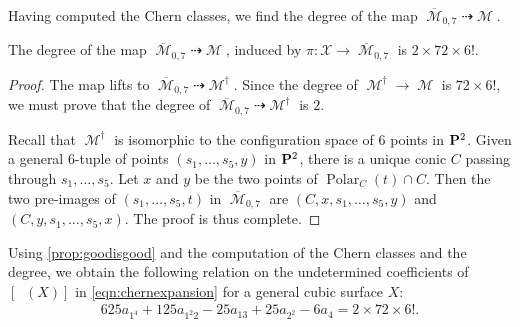 \documentclass[reqno]{amsart}
\DeclareMathOperator{\Orb}{\overline{Orb}}
\DeclareMathOperator{\Polar}{Polar}
\DeclareMathOperator{\M}{\mathcal{M}}
\renewcommand{\to}{{\longrightarrow}}
\renewcommand {\P}{{\bf P}}
\numberwithin{equation}{section}
\begin{document}
Having computed the Chern classes, we find the degree of the map $\overline{\M}_{0,7} \dashrightarrow \M$.
\begin{proposition}\label{prop:deg2}
  The degree of the map $\overline{\M}_{0,7} \dashrightarrow \M$, induced by $\pi \colon \mathcal{X} \to \overline{\M}_{0,7}$ is $2 \times 72 \times 6!$.
\end{proposition}
\begin{proof}
  The map lifts to $\overline{\M}_{0,7} \dashrightarrow \M^{\dagger}$.
  Since the degree of $\M^{\dagger} \to \M$ is $72 \times 6!$, we must prove that the degree of $\overline{\M}_{0,7} \dashrightarrow \M^{\dagger}$ is $2$.

  Recall that $\M^{\dagger}$ is isomorphic to the configuration space of 6 points in $\P^2$.
  Given a general 6-tuple of points $(s_1,\dots, s_5, y)$ in $\P^2$, there is a unique conic $C$ passing through $s_1,\dots, s_5$.
  Let $x$ and $y$ be the two points of $\Polar_C(t) \cap C$.
  Then the two pre-images of $(s_1,\dots, s_5, t)$ in $\overline{\M}_{0,7}$ are $(C, x, s_1, \dots, s_5, y)$ and $(C,y, s_1, \dots, s_5, x)$.
  The proof is thus complete.
\end{proof}

Using \autoref{prop:goodisgood} and the computation of the Chern classes and the degree, we obtain the following relation on the undetermined coefficients of $[\Orb(X)]$ in
\eqref{eqn:chernexpansion} for a general cubic surface $X$:
\begin{align}
  \label{eq:relation2}
  625 a_{1^{4}} + 125 a_{1^{2}2} - 25a_{13} + 25a_{2^2} - 6 a_{4} = 2 \times 72 \times 6!.
\end{align}

\end{document}
